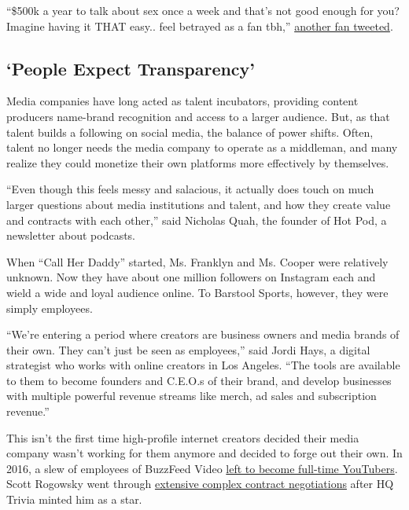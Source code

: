 ``\$500k a year to talk about sex once a week and that's not good enough
for you? Imagine having it THAT easy.. feel betrayed as a fan tbh,''
\href{https://twitter.com/ballerinaswifts/status/1262198053743853573}{another
fan tweeted}.

\hypertarget{people-expect-transparency}{%
\subsection{`People Expect
Transparency'}\label{people-expect-transparency}}

Media companies have long acted as talent incubators, providing content
producers name-brand recognition and access to a larger audience. But,
as that talent builds a following on social media, the balance of power
shifts. Often, talent no longer needs the media company to operate as a
middleman, and many realize they could monetize their own platforms more
effectively by themselves.

``Even though this feels messy and salacious, it actually does touch on
much larger questions about media institutions and talent, and how they
create value and contracts with each other,'' said Nicholas Quah, the
founder of Hot Pod, a newsletter about podcasts.

When ``Call Her Daddy'' started, Ms. Franklyn and Ms. Cooper were
relatively unknown. Now they have about one million followers on
Instagram each and wield a wide and loyal audience online. To Barstool
Sports, however, they were simply employees.

``We're entering a period where creators are business owners and media
brands of their own. They can't just be seen as employees,'' said Jordi
Hays, a digital strategist who works with online creators in Los
Angeles. ``The tools are available to them to become founders and
C.E.O.s of their brand, and develop businesses with multiple powerful
revenue streams like merch, ad sales and subscription revenue.''

This isn't the first time high-profile internet creators decided their
media company wasn't working for them anymore and decided to forge out
their own. In 2016, a slew of employees of BuzzFeed Video
\href{https://whatstrending.com/trending-videos/trending-now/23343-why-do-creators-leave-buzzfeed/}{left
to become full-time YouTubers}. Scott Rogowsky went through
\href{https://www.thedailybeast.com/ceo-of-hq-the-hottest-app-going-if-you-run-this-profile-well-fire-our-host}{extensive
complex contract negotiations} after HQ Trivia minted him as a star.

